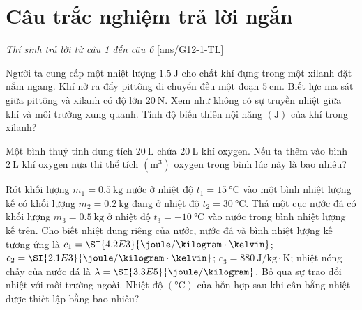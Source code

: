 \section{Câu trắc nghiệm trả lời ngắn} \textit{Thí sinh trả lời từ câu 1 đến câu 6}
\setcounter{ex}{0}
[ans/G12-1-TL]
\begin{ex}
	Người ta cung cấp một nhiệt lượng $\SI{1.5}{\joule}$ cho chất khí đựng trong một xilanh đặt nằm ngang. Khí nở ra đẩy pittông di chuyển đều một đoạn $\SI{5}{\centi\meter}$. Biết lực ma sát giữa pittông và xilanh có độ lớn $\SI{20}{\newton}$. Xem như không có sự truyền nhiệt giữa khí và môi trường xung quanh. Tính độ biến thiên nội năng $\left(\si{\joule}\right)$ của khí trong xilanh?	
\end{ex}
\begin{ex}
	Một bình thuỷ tinh dung tích $\SI{20}{\liter}$ chứa $\SI{20}{\liter}$ khí oxygen. Nếu ta thêm vào bình $\SI{2}{\liter}$ khí oxygen nữa thì thể tích $\left(\si{\meter^3}\right)$ oxygen trong bình lúc này là bao nhiêu?
\end{ex}
\begin{ex}
	Rót khối lượng $m_{1}=\SI{0.5}{\kilogram}$ nước ở nhiệt độ $t_{1}=\SI{15}{\celsius}$ vào một bình nhiệt lượng kế có khối lượng $m_{2}=\SI{0.2}{\kilogram}$ đang ở nhiệt độ $t_{2}=\SI{30}{\celsius}$. Thả một cục nước đá có khối lượng $m_{3}=\SI{0.5}{\kilogram}$ ở nhiệt độ $t_{3}=\SI{-10}{\celsius}$ vào nước trong bình nhiệt lượng kế trên. Cho biết nhiệt dung riêng của nước, nước đá và bình nhiệt lượng kế tương ứng là $c_{1}=\SI{4.2E3}{\joule/\kilogram\cdot\kelvin}$; $c_{2}=\SI{2.1E3}{\joule/\kilogram\cdot\kelvin}$; $c_{3}=\SI{880}{\joule/\kilogram\cdot\kelvin}$; nhiệt nóng chảy của nước đá là $\lambda=\SI{3.3E5}{\joule/\kilogram}$. Bỏ qua sự trao đổi nhiệt với môi trường ngoài. Nhiệt độ $\left(\si{\celsius}\right)$ của hỗn hợp sau khi cân bằng nhiệt được thiết lập bằng bao nhiêu?
\end{ex}

